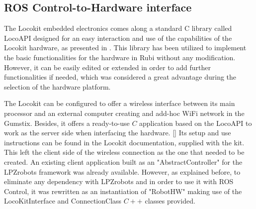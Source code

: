 \subsection{ROS Control-to-Hardware interface} %
\label{sub:ros_control_hardware_locokit_interface}
The Locokit embedded electronics comes along a standard C library called LocoAPI designed for an easy interaction and use of the capabilities of the Locokit hardware, as presented in \cite{locokit}.
This library has been utilized to implement the basic functionalities for the hardware in Rubi without any modification.
However, it can be easily edited or extended in order to add further functionalities if needed, which was considered a great advantage during the selection of the hardware platform.

The Locokit can be configured to offer a wireless interface between its main processor and an external computer creating and add-hoc WiFi network in the Gumstix.
Besides, it offers a ready-to-use $C$ application based on the LocoAPI to work as the server side when interfacing the hardware. \ref{} %
Its setup and use instructions can be found in the Locokit documentation, supplied with the kit.
This left the client side of the wireless connection as the one that needed to be created.
An existing client application built as an "AbstractController" for the LPZrobots framework was already available. 
However, as explained before, to eliminate any dependency with LPZrobots and in order to use it with ROS Control, it was rewritten as an instantiation of "RobotHW" making use of the LocoKitInterface and ConnectionClass $C++$ classes provided.


